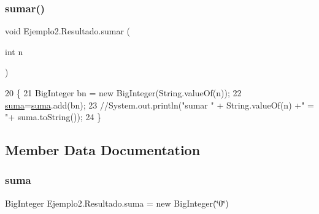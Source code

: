 \subsubsection{\texorpdfstring{sumar()}{sumar()}}
{\footnotesize\ttfamily void Ejemplo2.\+Resultado.\+sumar (\begin{DoxyParamCaption}\item[{int}]{n }\end{DoxyParamCaption})\hspace{0.3cm}{\ttfamily [inline]}}


\begin{DoxyCode}
20     \{
21         BigInteger bn = \textcolor{keyword}{new} BigInteger(String.valueOf(n));
22         \mbox{\hyperlink{namespacesuma}{suma}}=\mbox{\hyperlink{namespacesuma}{suma}}.add(bn);
23         \textcolor{comment}{//System.out.println("sumar " + String.valueOf(n) +" = "+ suma.toString());}
24     \}
\end{DoxyCode}


\subsection{Member Data Documentation}
\mbox{\label{class_ejemplo2_1_1_resultado_a9b798ec8c3c4e919b47cb0c95ee6ebc9}} 
\subsubsection{\texorpdfstring{suma}{suma}}
{\footnotesize\ttfamily Big\+Integer Ejemplo2.\+Resultado.\+suma = new Big\+Integer(\char`\"{}0\char`\"{})\hspace{0.3cm}{\ttfamily [private]}}

